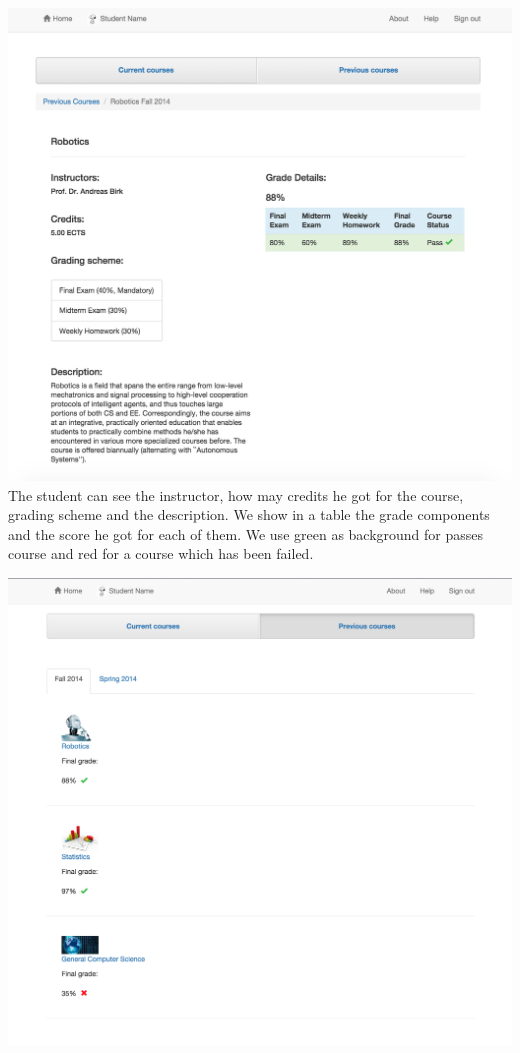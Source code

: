 \includegraphics[width=\textwidth]{screenshots/PreviousCourseDetail.png}
\newpage
The student can see the instructor, how may credits he got for the course, grading scheme and the description. We show in a table the grade components and the score he got for each of them. We use green as background for passes course and red for a course which has been failed.

\includegraphics[width=.85\textwidth]{screenshots/PreviousCourses.png}
